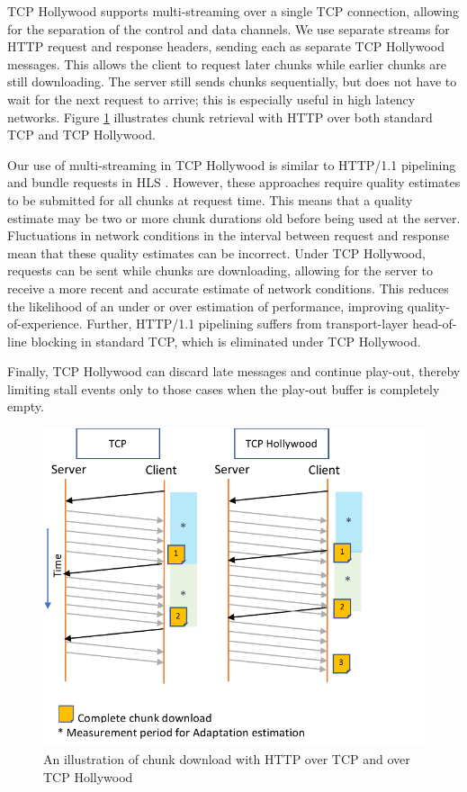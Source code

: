 TCP Hollywood supports multi-streaming over a single TCP connection, allowing for the
separation of the control and data channels. We use separate streams for HTTP request and
response headers, sending each as separate TCP Hollywood messages. This allows the client
to request later chunks while earlier chunks are still downloading. The server still sends
chunks sequentially, but does not have to wait for the next request to arrive; this is
especially useful in high latency networks. Figure \ref{fig:hollywood_download}
illustrates chunk retrieval with HTTP over both standard TCP and TCP Hollywood.

Our use of multi-streaming in TCP Hollywood is similar to HTTP/1.1 pipelining and bundle
requests in HLS \cite{muller2012evaluation}. However, these approaches require quality
estimates to be submitted for all chunks at request time. This means that a quality
estimate may be two or more chunk durations old before being used at the server.
Fluctuations in network conditions in the interval between request and response mean that
these quality estimates can be incorrect. Under TCP Hollywood, requests can be sent while
chunks are downloading, allowing for the server to receive a more recent and accurate
estimate of network conditions. This reduces the likelihood of an under or over estimation
of performance, improving quality-of-experience. Further, HTTP/1.1 pipelining suffers
from transport-layer head-of-line blocking in standard TCP, which is eliminated under TCP Hollywood.

Finally, TCP Hollywood can discard late messages and continue play-out,
thereby limiting stall events only to those cases when the play-out buffer is completely
empty.

\begin{figure}
    \centering
    \includegraphics[width=\columnwidth]{figures/tcph-download.pdf}
    \caption{An illustration of chunk download with HTTP over TCP and over TCP Hollywood}
    \label{fig:hollywood_download}
\end{figure}

